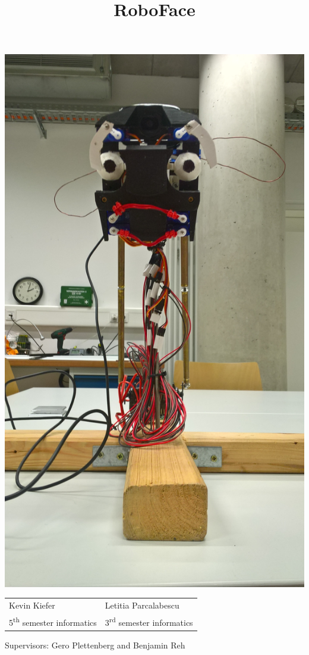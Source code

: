 \documentclass[12.5pt]{scrartcl}
\title{RoboFace}
\date{\vspace{-7ex}}
\begin{document}
 
	\maketitle
	\thispagestyle{empty}
	
	\includegraphics[width=0.88\linewidth]{images/roboFace}
	
	\begin{tabularx}{\textwidth}{Xl} 
		Kevin Kiefer      & Letitia Parcalabescu \\ 
		5\textsuperscript{th} semester informatics  & 3\textsuperscript{rd} semester informatics \\ 
	\end{tabularx}
	
	Supervisors: Gero Plettenberg and Benjamin Reh
	
\end{document}
